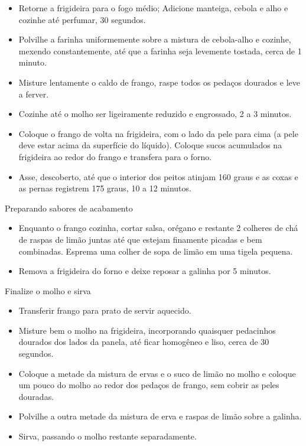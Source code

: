 \documentclass [11pt, letterpaper] {article}
\begin{document}
\begin {description}
\begin {description}
\begin {itemize}
\item Retorne a frigideira para o fogo médio; Adicione manteiga, cebola e alho e cozinhe até perfumar, 30 segundos.
\item Polvilhe a farinha uniformemente sobre a mistura de cebola-alho e cozinhe, mexendo constantemente, até que a farinha seja levemente tostada, cerca de 1 minuto.
\item Misture lentamente o caldo de frango, raspe todos os pedaços dourados e leve a ferver.
\item Cozinhe até o molho ser ligeiramente reduzido e engrossado, 2 a 3 minutos.
\item Coloque o frango de volta na frigideira, com o lado da pele para cima (a pele deve estar acima da superfície do líquido). Coloque sucos acumulados na frigideira ao redor do frango e transfera para o forno.
\item Asse, descoberto, até que o interior dos peitos atinjam  160 graus e as coxas e as pernas registrem 175 graus, 10 a 12 minutos. \end {itemize}
\item [Preparando sabores de acabamento] \ \\
\begin {itemize}
\item Enquanto o frango cozinha, cortar salsa, orégano e restante 2 colheres de chá de raspas de lim\~ao juntas até que estejam finamente picadas e bem combinadas. Esprema uma colher de sopa de limão em uma tigela pequena.
\item Remova a frigideira do forno e deixe reposar a galinha por 5 minutos.
\end {itemize}
\item [Finalize o molho e sirva] \ \\
\begin{itemize}
\item Transferir frango para prato de servir aquecido.
\item Misture bem o molho na frigideira, incorporando quaisquer pedacinhos dourados dos lados da panela, até ficar homogêneo e liso, cerca de 30 segundos.
\item Coloque a metade da mistura de ervas e o suco de limão no molho e coloque um pouco do molho ao redor dos peda\c{c}os de frango, sem cobrir as peles douradas.
\item Polvilhe a outra metade da mistura de erva e raspas de lim\~ao sobre a galinha.
\item Sirva, passando o molho restante separadamente.
\end {itemize}
\end{description}
\end {description}
\end{document}
